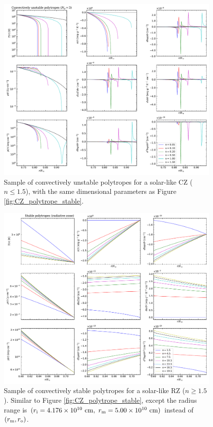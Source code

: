 \documentclass[12pt]{article} %
\newcommand{\rrm}{r_{\rm{m}}}
\newcommand{\ri}{r_{\rm{i}}}
\newcommand{\ro}{r_{\rm{o}}}
\begin{document}
  \begin{figure}
	\includegraphics[scale=0.6]{figures/CZ_polytrope_unstable.pdf}
	\caption{Sample of convectively unstable polytropes for a solar-like CZ ($n\leq1.5$), with the same dimensional parameters as Figure \ref{fig:CZ_polytrope_stable}.}
	\label{fig:CZ_polytrope_unstable}
\end{figure}

  \begin{figure}
	\includegraphics[scale=0.6]{figures/RZ_polytrope_stable.pdf}
	\caption{Sample of convectively stable polytropes for a solar-like RZ ($n\geq1.5$). Similar to Figure \ref{fig:CZ_polytrope_stable}, except the radius range is $(\ri=4.176\times10^{10}\ {\rm{cm}},\ \rrm=5.00\times10^{10}\ \rm{cm})$ instead of $(\rrm,\ro)$.}
	\label{fig:RZ_polytrope_stable}
\end{figure}
\end{document}
